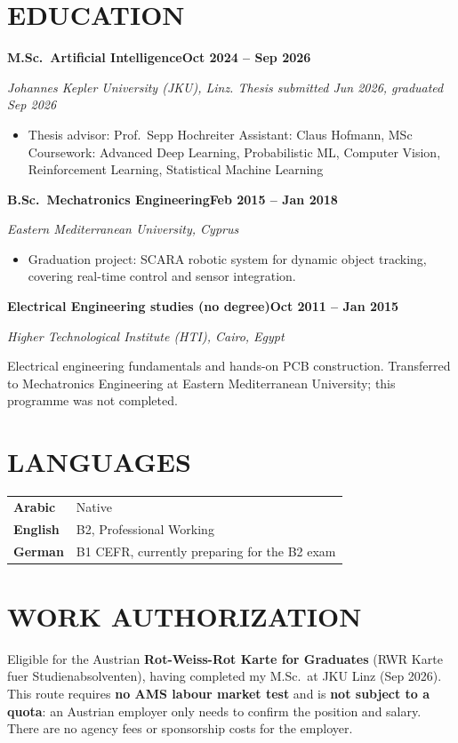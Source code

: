 \documentclass[11pt,a4paper]{article}
\newcommand{\role}[2]{%
  \noindent\textbf{#1}\hfill\textbf{\color{midgray}#2}\par%
}
\newcommand{\org}[1]{\noindent\textit{#1}\par\vspace{1pt}}
\newcommand{\skillrow}[2]{%
  \textbf{#1} & #2 \\[1pt]%
}
\begin{document}
\section*{EDUCATION}

\role{M.Sc.\ Artificial Intelligence}{Oct 2024 -- Sep 2026}
\org{Johannes Kepler University (JKU), Linz. Thesis submitted Jun 2026, graduated Sep 2026}
\begin{itemize}
  \item Thesis advisor: Prof.\ Sepp Hochreiter \textbullet{} Assistant: Claus Hofmann, MSc \textbullet{} Coursework: Advanced Deep Learning, Probabilistic ML, Computer Vision, Reinforcement Learning, Statistical Machine Learning
\end{itemize}
\vspace{1pt}

\role{B.Sc.\ Mechatronics Engineering}{Feb 2015 -- Jan 2018}
\org{Eastern Mediterranean University, Cyprus}
\begin{itemize}
  \item Graduation project: SCARA robotic system for dynamic object tracking, covering real-time control and sensor integration.
\end{itemize}
\vspace{1pt}

\role{Electrical Engineering studies (no degree)}{Oct 2011 -- Jan 2015}
\org{Higher Technological Institute (HTI), Cairo, Egypt}
Electrical engineering fundamentals and hands-on PCB construction. Transferred to Mechatronics Engineering at Eastern Mediterranean University; this programme was not completed.

\section*{LANGUAGES}
\renewcommand{\arraystretch}{1.02}
\noindent\begin{tabularx}{\textwidth}{@{}>{\raggedright\arraybackslash}p{3.9cm}X@{}}
\skillrow{Arabic}{Native}
\skillrow{English}{B2, Professional Working}
\skillrow{German}{B1 CEFR, currently preparing for the B2 exam}
\end{tabularx}

\section*{WORK AUTHORIZATION}
Eligible for the Austrian \textbf{Rot-Weiss-Rot Karte for Graduates} (RWR Karte fuer Studienabsolventen), having completed my M.Sc.\ at JKU Linz (Sep 2026). This route requires \textbf{no AMS labour market test} and is \textbf{not subject to a quota}: an Austrian employer only needs to confirm the position and salary. There are no agency fees or sponsorship costs for the employer.
\end{document}
